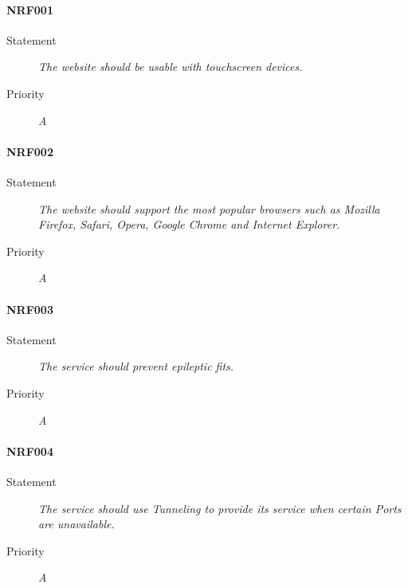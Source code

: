 \paragraph{NRF001}
\begin{description}
  \item [Statement] 
    \textit{The website should be usable with touchscreen devices.}
  \item [Priority] \textit{A}
\end{description}

\paragraph{NRF002}
\begin{description}
  \item [Statement] 
    \textit{The website should support the most popular browsers such as Mozilla Firefox, Safari, Opera, Google Chrome and Internet Explorer.}
  \item [Priority] \textit{A}
\end{description}

\paragraph{NRF003}
\begin{description}
  \item [Statement] 
    \textit{The service should prevent epileptic fits.}
  \item [Priority] \textit{A}
\end{description}

\paragraph{NRF004}
\begin{description}
  \item [Statement] 
    \textit{The service should use \gls{Tunneling} to provide its service when certain \gls{Ports} are unavailable.}
  \item [Priority] \textit{A}
\end{description}

